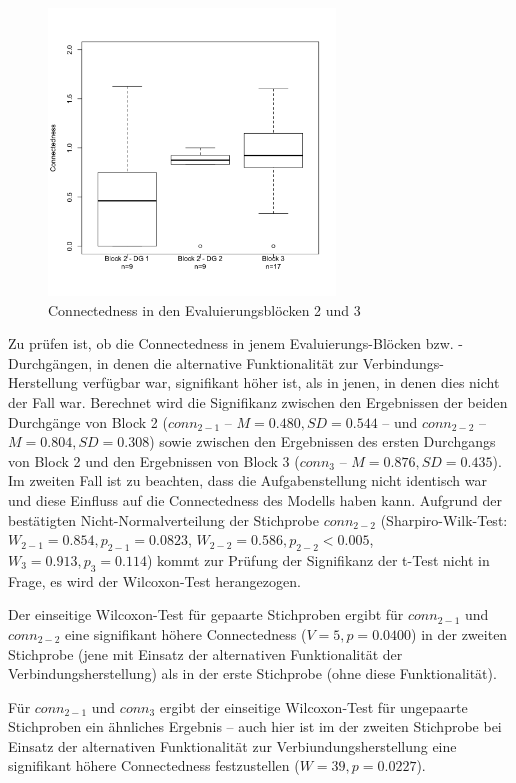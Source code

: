 \begin{figure}[htbp]
	\centering
		\includegraphics[height=3in]{img/Evaluierung/connectednessOverview.png}
	\caption{Connectedness in den Evaluierungsblöcken 2 und 3}
	\label{fig:img_Evaluierung_connectednessOverview}
\end{figure} 

Zu prüfen ist, ob die Connectedness in jenem Evaluierungs-Blöcken bzw. -Durchgängen, in denen die alternative Funktionalität zur Verbindungs-Herstellung verfügbar war, signifikant höher ist, als in jenen, in denen dies nicht der Fall war. Berechnet wird die Signifikanz zwischen den Ergebnissen der beiden Durchgänge von Block 2 ($conn_{2-1}$ -- $M=0.480, SD=0.544$ -- und $conn_{2-2}$ -- $M=0.804, SD=0.308$) sowie zwischen den Ergebnissen des ersten Durchgangs von Block 2 und den Ergebnissen von Block 3 ($conn_{3}$ -- $M=0.876, SD=0.435$). Im zweiten Fall ist zu beachten, dass die Aufgabenstellung nicht identisch war und diese Einfluss auf die Connectedness des Modells haben kann. Aufgrund der bestätigten Nicht-Normalverteilung der Stichprobe $conn_{2-2}$ (Sharpiro-Wilk-Test: $W_{2-1}=0.854, p_{2-1}=0.0823$, $W_{2-2}=0.586, p_{2-2}<0.005$, $W_{3}=0.913, p_{3}=0.114$) kommt zur Prüfung der Signifikanz der t-Test nicht in Frage, es wird der Wilcoxon-Test herangezogen.

Der einseitige Wilcoxon-Test für gepaarte Stichproben ergibt für $conn_{2-1}$ und $conn_{2-2}$ eine signifikant höhere Connectedness ($V=5, p=0.0400$) in der zweiten Stichprobe (jene mit Einsatz der alternativen Funktionalität der Verbindungsherstellung) als in der erste Stichprobe (ohne diese Funktionalität). 

Für $conn_{2-1}$ und $conn_{3}$ ergibt der einseitige Wilcoxon-Test für ungepaarte Stichproben ein ähnliches Ergebnis -- auch hier ist im der zweiten Stichprobe bei Einsatz der alternativen Funktionalität zur Verbiundungsherstellung eine signifikant höhere Connectedness festzustellen ($W=39, p=0.0227$).

